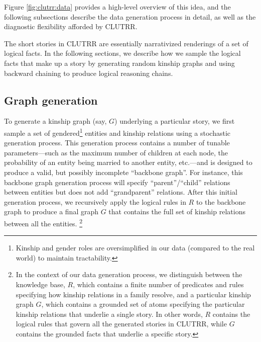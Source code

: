 \documentclass[letterpaper, 12pt]{report}
\begin{document}
Figure \ref{fig:clutrr:data} provides a high-level overview of this idea, and the following subsections describe the data generation process in detail, as well as the diagnostic flexibility afforded by CLUTRR.



The short stories in CLUTRR are essentially narrativized renderings of a set of logical facts.
In the following sections, we describe how we sample the logical facts that make up a story by generating random kinship graphs and using backward chaining to produce logical reasoning chains.


\subsection{Graph generation}


To generate a kinship graph (say, $G$) underlying a particular story, we first sample a set of gendered\footnote{Kinship and gender roles are oversimplified in our data (compared to the real world) to maintain tractability.} entities and kinship relations using a stochastic generation process.
This generation process contains a number of tunable parameters---such as the maximum number of children at each node, the probability of an entity being married to another entity, etc.---and is designed to produce a valid, but possibly incomplete ``backbone graph''.
For instance, this backbone graph generation process will specify ``parent''/``child'' relations between entities but does not add ``grandparent'' relations.
After this initial generation process, we recursively apply the logical rules in $R$ to the backbone graph to produce a final graph $G$ that contains the full set of kinship relations between all the entities.
\footnote{In the context of our data generation process, we distinguish between the knowledge base, $R$, which contains a finite number of predicates and rules specifying how kinship relations in a family resolve, and a particular kinship graph $G$, which contains a grounded set of atoms specifying the particular kinship relations that underlie a single story.
In other words, $R$ contains the logical rules that govern all the generated stories in CLUTRR, while $G$ contains the grounded facts that underlie a specific story.}
\end{document}

